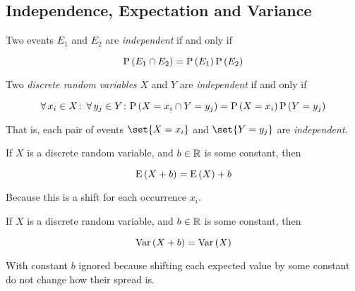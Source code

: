 \subsection{Independence, Expectation and Variance}

\begin{remark}
    Two events $E_1$ and $E_2$ are \textit{independent} if and only if

    \begin{equation*}
        \mathrm{P} \left( E_1 \cap E_2 \right) = \mathrm{P} \left( E_1 \right) \mathrm{P} \left( E_2 \right)
    \end{equation*}
\end{remark}

\begin{definition}
    Two \textit{discrete random variables} $X$ and $Y$ are \textit{independent}
    if and only if

    \begin{equation}
        \operatorname{\forall} x_i \in X \colon \operatorname{\forall} y_j \in Y \colon
            \mathrm{P} \left( X = x_i \cap Y = y_j \right) = \mathrm{P} \left( X = x_i \right) \mathrm{P} \left( Y = y_j \right)
    \end{equation}

    That is, each pair of events $\set{ X = x_i }$ and $\set{ Y = y_j }$ are
    \textit{independent}.
\end{definition}

\begin{definition}
    If $X$ is a discrete random variable, and $b \in \mathbb{R}$ is some constant,
    then

    \begin{equation}
        \mathrm{E} \left( X + b \right) = \mathrm{E} \left( X \right) + b
    \end{equation}

    Because this is a shift for each occurrence $x_i$.
\end{definition}

\begin{definition}
    If $X$ is a discrete random variable, and $b \in \mathbb{R}$ is some constant,
    then

    \begin{equation}
        \mathrm{Var} \left( X + b \right) = \mathrm{Var} \left( X \right)
    \end{equation}

    With constant $b$ ignored because shifting each expected value by some
    constant do not change how their spread is.
\end{definition}

